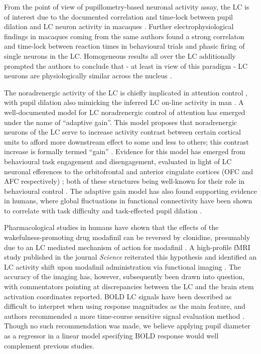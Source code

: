 	From the point of view of pupillometry-based neuronal activity assay, the LC is of interest due to the documented correlation and time-lock between pupil dilation and LC neuron activity in macaques \citep{Rajkowski1994}.
	Further electrophysiological findings in macaques coming from the same authors \citep{Rajkowski2004} found a strong correlaton and time-lock between reaction times in behavioural trials and phasic firing of single neurons in the LC.
	Homogeneous results all over the LC additionally prompted the authors to conclude that - at least in view of this paradigm - LC neurons are physiologically similar across the nucleus \citep{Rajkowski2004}.
	
	The noradrenergic activity of the LC is chiefly implicated in attention control \citep{Aston-Jones1994,Gabay2011}, with pupil dilation also mimicking the inferred LC on-line activity in man \citep{Gabay2011}.
	A well-documented model for LC noradrenergic control of attention has emerged under the name of “adaptive gain”.
	This model proposes that noradrenergic neurons of the LC serve to increase activity contrast between certain cortical units to afford more downstream effect to some and less to others; this contrast increase is formally termed “gain”  \citep{Aston-Jones2005}.
	Evidence for this model has emerged from behavioural task engagement and disengagement, evaluated in light of LC neuronal efferences to the orbitofrontal and anterior cingulate cortices (OFC and AFC respectively) \citep{Aston-Jones2005}; both of these structures being well-known for their role in behavioural control \citep{Baxter2013,Kerns2004}.
	The adaptive gain model has also found supporting evidence in humans, where global fluctuations in functional connectivity have been shown to correlate with task difficulty and task-effected pupil dilation \citep{Eldar2013}.
	
	Pharmacological studies in humans have shown that the effects of the wakefulness-promoting drug \citep{Engber1998} modafinil can be reversed by clonidine, presumably due to an LC mediated mechanism of action for modafinil \citep{Hou2005}.
	A high-profile fMRI study published in the journal \textit{Science} reiterated this hypothesis and identified an LC activity shift upon modafinil administration via functional imaging \citep{Minzenberg2008}.
	The accuracy of the imaging has, however, subsequently been drawn into question, with commentators \citep{Astafiev2010} pointing at discrepancies between the LC and the brain stem activation coordinates reported.  
	BOLD LC signals have been described as difficult to interpret when using response magnitudes as the main feature, and authors recommended a more time-course sensitive signal evaluation method \citep{Astafiev2010}.
	Though no such recommendation was made, we believe applying pupil diameter as a regressor in a linear model specifying BOLD response would well complement previous studies. 

